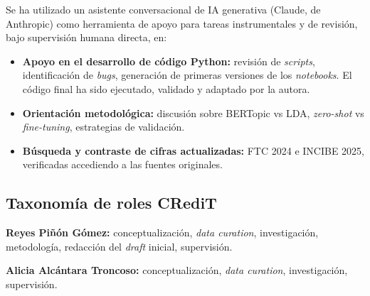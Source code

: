 Se ha utilizado un asistente conversacional de IA generativa (Claude, de Anthropic) como herramienta de apoyo para tareas instrumentales y de revisión, bajo supervisión humana directa, en:

\begin{itemize}
    \item \textbf{Apoyo en el desarrollo de código Python:} revisión de \textit{scripts}, identificación de \textit{bugs}, generación de primeras versiones de los \textit{notebooks}. El código final ha sido ejecutado, validado y adaptado por la autora.
    \item \textbf{Orientación metodológica:} discusión sobre BERTopic vs LDA, \textit{zero-shot} vs \textit{fine-tuning}, estrategias de validación.
    \item \textbf{Búsqueda y contraste de cifras actualizadas:} FTC 2024 e INCIBE 2025, verificadas accediendo a las fuentes originales.
\end{itemize}

\clearpage
\subsection*{Taxonomía de roles CRediT}

\textbf{Reyes Piñón Gómez:} conceptualización, \textit{data curation}, investigación, metodología, redacción del \textit{draft} inicial, supervisión.

\textbf{Alicia Alcántara Troncoso:} conceptualización, \textit{data curation}, investigación, supervisión.
